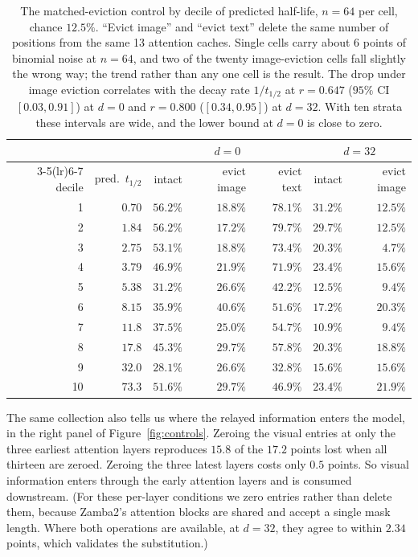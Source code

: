 \documentclass{article}
\begin{document}
\begin{table}[h]
\centering\small
\begin{tabular}{rrrrrrr}
\toprule
& & \multicolumn{3}{c}{$d = 0$} & \multicolumn{2}{c}{$d = 32$} \\
\cmidrule(lr){3-5}\cmidrule(lr){6-7}
decile & pred.\ $t_{1/2}$ & intact & evict image & evict text & intact & evict image \\
\midrule
1  & $0.70$ & $56.2\%$ & $18.8\%$ & $78.1\%$ & $31.2\%$ & $12.5\%$ \\
2  & $1.84$ & $56.2\%$ & $17.2\%$ & $79.7\%$ & $29.7\%$ & $12.5\%$ \\
3  & $2.75$ & $53.1\%$ & $18.8\%$ & $73.4\%$ & $20.3\%$ & $4.7\%$  \\
4  & $3.79$ & $46.9\%$ & $21.9\%$ & $71.9\%$ & $23.4\%$ & $15.6\%$ \\
5  & $5.38$ & $31.2\%$ & $26.6\%$ & $42.2\%$ & $12.5\%$ & $9.4\%$  \\
6  & $8.15$ & $35.9\%$ & $40.6\%$ & $51.6\%$ & $17.2\%$ & $20.3\%$ \\
7  & $11.8$ & $37.5\%$ & $25.0\%$ & $54.7\%$ & $10.9\%$ & $9.4\%$  \\
8  & $17.8$ & $45.3\%$ & $29.7\%$ & $57.8\%$ & $20.3\%$ & $18.8\%$ \\
9  & $32.0$ & $28.1\%$ & $26.6\%$ & $32.8\%$ & $15.6\%$ & $15.6\%$ \\
10 & $73.3$ & $51.6\%$ & $29.7\%$ & $46.9\%$ & $23.4\%$ & $21.9\%$ \\
\bottomrule
\end{tabular}
\caption{The matched-eviction control by decile of predicted half-life, $n = 64$
per cell, chance $12.5\%$. ``Evict image'' and ``evict text'' delete the same
number of positions from the same 13 attention caches. Single cells carry about
$6$ points of binomial noise at $n = 64$, and two of the twenty image-eviction
cells fall slightly the wrong way; the trend rather than any one cell is the
result. The drop under image eviction correlates with the decay rate
$1/t_{1/2}$ at $r = 0.647$ ($95\%$ CI $[0.03, 0.91]$) at $d{=}0$ and $r = 0.800$ ($[0.34, 0.95]$) at $d{=}32$. With ten strata these intervals are wide, and the lower bound at $d{=}0$ is close to zero.}
\label{tab:controls}
\end{table}

The same collection also tells us where the relayed information enters the
model, in the right panel of Figure~\ref{fig:controls}. Zeroing the visual
entries at only the three earliest attention layers reproduces $15.8$ of the
$17.2$ points lost when all thirteen are zeroed. Zeroing the three latest
layers costs only $0.5$ points. So visual information enters through the early
attention layers and is consumed downstream. (For these per-layer conditions
we zero entries rather than delete them, because Zamba2's attention blocks are
shared and accept a single mask length. Where both operations are available,
at $d{=}32$, they agree to within $2.34$ points, which validates the
substitution.)
\end{document}
